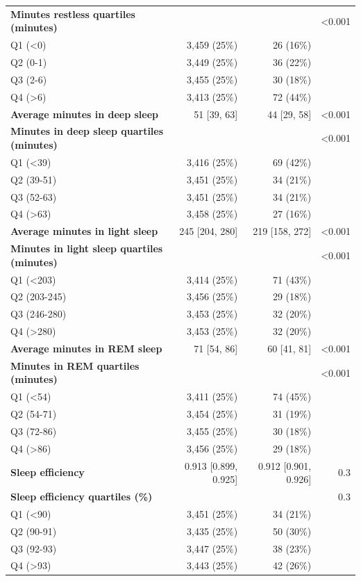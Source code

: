 \documentclass[11pt]{article}
\begin{document}
\begin{longtable}{@{}p{6.4cm}rrr@{}}
\textbf{Minutes restless quartiles (minutes)} &  &  & <0.001 \\
\quad Q1 (<0) & 3,459 (25\%) & 26 (16\%) &  \\
\quad Q2 (0-1) & 3,449 (25\%) & 36 (22\%) &  \\
\quad Q3 (2-6) & 3,455 (25\%) & 30 (18\%) &  \\
\quad Q4 (>6) & 3,413 (25\%) & 72 (44\%) &  \\
\textbf{Average minutes in deep sleep} & 51 [39, 63] & 44 [29, 58] & <0.001 \\
\textbf{Minutes in deep sleep quartiles (minutes)} &  &  & <0.001 \\
\quad Q1 (<39) & 3,416 (25\%) & 69 (42\%) &  \\
\quad Q2 (39-51) & 3,451 (25\%) & 34 (21\%) &  \\
\quad Q3 (52-63) & 3,451 (25\%) & 34 (21\%) &  \\
\quad Q4 (>63) & 3,458 (25\%) & 27 (16\%) &  \\
\textbf{Average minutes in light sleep} & 245 [204, 280] & 219 [158, 272] & <0.001 \\
\textbf{Minutes in light sleep quartiles (minutes)} &  &  & <0.001 \\
\quad Q1 (<203) & 3,414 (25\%) & 71 (43\%) &  \\
\quad Q2 (203-245) & 3,456 (25\%) & 29 (18\%) &  \\
\quad Q3 (246-280) & 3,453 (25\%) & 32 (20\%) &  \\
\quad Q4 (>280) & 3,453 (25\%) & 32 (20\%) &  \\
\textbf{Average minutes in REM sleep} & 71 [54, 86] & 60 [41, 81] & <0.001 \\
\textbf{Minutes in REM quartiles (minutes)} &  &  & <0.001 \\
\quad Q1 (<54) & 3,411 (25\%) & 74 (45\%) &  \\
\quad Q2 (54-71) & 3,454 (25\%) & 31 (19\%) &  \\
\quad Q3 (72-86) & 3,455 (25\%) & 30 (18\%) &  \\
\quad Q4 (>86) & 3,456 (25\%) & 29 (18\%) &  \\
\textbf{Sleep efficiency} & 0.913 [0.899, 0.925] & 0.912 [0.901, 0.926] & 0.3 \\
\textbf{Sleep efficiency quartiles (\%)} &  &  & 0.3 \\
\quad Q1 (<90) & 3,451 (25\%) & 34 (21\%) &  \\
\quad Q2 (90-91) & 3,435 (25\%) & 50 (30\%) &  \\
\quad Q3 (92-93) & 3,447 (25\%) & 38 (23\%) &  \\
\quad Q4 (>93) & 3,443 (25\%) & 42 (26\%) &  \\
\bottomrule \end{longtable}\normalsize
\end{document}
